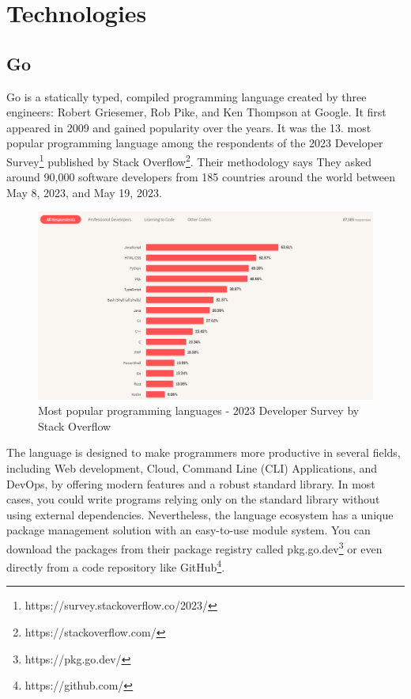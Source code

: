 \chapter{Technologies}

\section{Go}
Go is a statically typed, compiled programming language created by three engineers: Robert Griesemer, Rob Pike, and Ken Thompson at Google. It first appeared in 2009 and gained popularity over the years. It was the 13. most popular programming language among the respondents of the 2023 Developer Survey\footnote{https://survey.stackoverflow.co/2023/} published by Stack Overflow\footnote{https://stackoverflow.com/}. Their methodology says They asked around 90,000 software developers from 185 countries around the world between May 8, 2023, and May 19, 2023.

\begin{figure}
    \centering
    \includegraphics[width=160mm, keepaspectratio]{figures/go-stack-overflow.png}
    \caption{Most popular programming languages - 2023 Developer Survey by Stack Overflow}
\end{figure}

The language is designed to make programmers more productive in several fields, including  Web development, Cloud, Command Line (CLI) Applications, and DevOps, by offering modern features and a robust standard library. In most cases, you could write programs relying only on the standard library without using external dependencies. Nevertheless, the language ecosystem has a unique package management solution with an easy-to-use module system. You can download the packages from their package registry called pkg.go.dev\footnote{https://pkg.go.dev/} or even directly from a code repository like GitHub\footnote{https://github.com/}.

